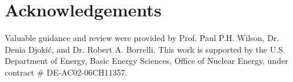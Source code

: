 \section{Acknowledgements}
Valuable guidance and review were provided by Prof. Paul P.H. Wilson, Dr. Denia 
Djoki\'{c}, and Dr. Robert A. Borrelli. This work is supported by the U.S. 
Department of Energy, Basic Energy Sciences, Office of Nuclear Energy, under 
contract \# DE-AC02-06CH11357.
